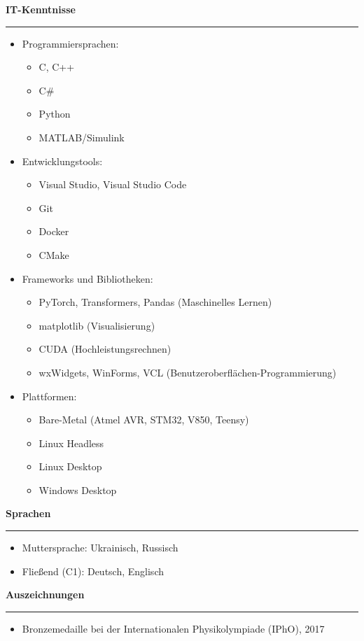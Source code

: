 \documentclass[12pt]{article} %
\newcommand{\HighlightedText}[1] {{\textbf{#1}}}
\newenvironment{ItemizeSection}[1]{
    \vspace{1mm}
    \HighlightedText{#1}
    \vspace{0.5mm}
    {\color{custom_blue} \hrule}
    \begin{itemize}[left=0.5em, topsep=0pt, itemsep=0pt, label={$\bullet$}]
}{
    \end{itemize}
}
\newenvironment{ItemizeSubsection}{
    \begin{itemize}[left=0.5em, topsep=-999pt, itemsep=0pt, label={$\circ$}]
}{
    \end{itemize}
}
\begin{document}
\newpage
\begin{ItemizeSection}{IT-Kenntnisse}
\item Programmiersprachen:
    \begin{ItemizeSubsection}
        \item C, C++
        \item C\#
        \item Python
        \item MATLAB/Simulink
    \end{ItemizeSubsection}
    \item Entwicklungstools:
    \begin{ItemizeSubsection}
        \item Visual Studio, Visual Studio Code
        \item Git
        \item Docker
        \item CMake
    \end{ItemizeSubsection}
    \item Frameworks und Bibliotheken:
    \begin{ItemizeSubsection}
        \item PyTorch, Transformers, Pandas (Maschinelles Lernen)
        \item matplotlib (Visualisierung)
        \item CUDA (Hochleistungsrechnen)
        \item wxWidgets, WinForms, VCL (Benutzeroberflächen-Programmierung)
    \end{ItemizeSubsection}
    \item Plattformen:
    \begin{ItemizeSubsection}
        \item Bare-Metal (Atmel AVR, STM32, V850, Teensy)
        \item Linux Headless
        \item Linux Desktop
        \item Windows Desktop
    \end{ItemizeSubsection}
\end{ItemizeSection}



\begin{ItemizeSection}{Sprachen}
    \item Muttersprache: Ukrainisch, Russisch
    \item Fließend (C1): Deutsch, Englisch
\end{ItemizeSection}

\begin{ItemizeSection}{Auszeichnungen}
    \item Bronzemedaille bei der Internationalen Physikolympiade (IPhO), 2017
\end{ItemizeSection}
\end{document}
